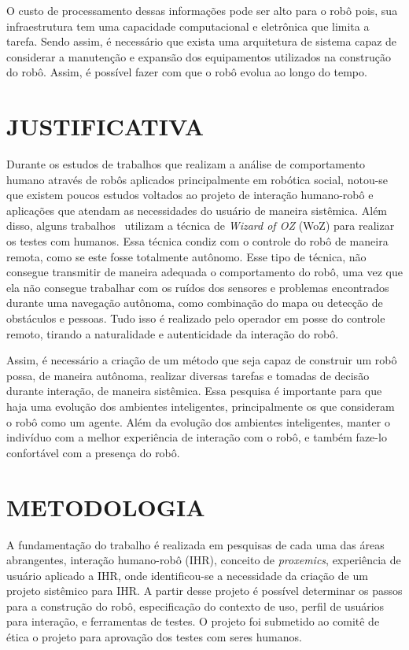 O custo de processamento dessas informações pode ser alto para o robô pois, sua infraestrutura tem uma capacidade computacional e eletrônica que limita a tarefa. Sendo assim, é necessário que exista uma arquitetura de sistema capaz de considerar a manutenção e expansão dos equipamentos utilizados na construção do robô. Assim, é possível fazer com que o robô evolua ao longo do tempo.

\section{JUSTIFICATIVA}
Durante os estudos de trabalhos que realizam a análise de comportamento humano através de robôs aplicados principalmente em robótica social, notou-se que existem poucos estudos voltados ao projeto de interação humano-robô e aplicações que atendam as necessidades do usuário de maneira sistêmica. Além disso, alguns trabalhos~\cite{okita:2012, henkel:2012b, vazquez:2014} utilizam a técnica de \emph{Wizard of OZ} (WoZ) para realizar os testes com humanos. Essa técnica condiz com o controle do robô de maneira remota, como se este fosse totalmente autônomo. Esse tipo de técnica, não consegue transmitir de maneira adequada o comportamento do robô, uma vez que ela não consegue trabalhar com os ruídos dos sensores e problemas encontrados durante uma navegação autônoma, como combinação do mapa ou detecção de obstáculos e pessoas. Tudo isso é realizado pelo operador em posse do controle remoto, tirando a naturalidade e autenticidade da interação do robô.

Assim,  é necessário a criação de um método que seja capaz de construir um robô possa, de maneira autônoma, realizar diversas tarefas e tomadas de decisão durante interação, de maneira sistêmica. Essa pesquisa é importante para que haja uma evolução dos ambientes inteligentes, principalmente os que consideram o robô como um agente. Além da evolução dos ambientes inteligentes, manter o indivíduo com a melhor experiência de interação com o robô, e também faze-lo confortável com a presença do robô.

\section{METODOLOGIA}
A fundamentação do trabalho é realizada em pesquisas de cada uma das áreas abrangentes, interação humano-robô (IHR), conceito de \emph{proxemics}, experiência de usuário aplicado a IHR, onde identificou-se a necessidade da criação de um projeto sistêmico para IHR. A partir desse projeto é possível determinar os passos para a construção do robô, especificação do contexto de uso, perfil de usuários para interação, e ferramentas de testes. O projeto foi submetido ao comitê de ética o projeto para aprovação dos testes com seres humanos.

